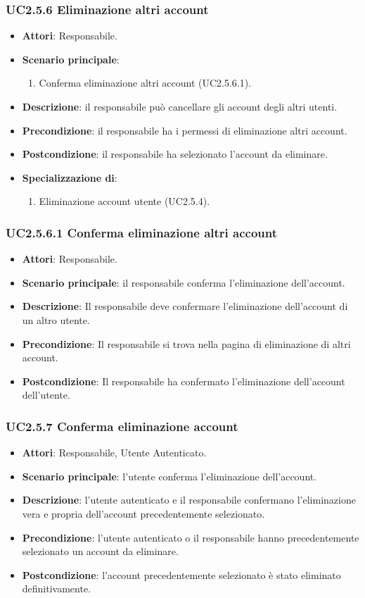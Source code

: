 \subsubsection{UC2.5.6 Eliminazione altri account}
\begin{itemize}
\item \textbf{Attori}: Responsabile.
\item \textbf{Scenario principale}:
\begin{enumerate}
\item Conferma eliminazione altri account (UC2.5.6.1).
\end{enumerate}
\item \textbf{Descrizione}: il responsabile può cancellare gli account degli altri utenti.
\item \textbf{Precondizione}: il responsabile ha i permessi di eliminazione altri account.
\item \textbf{Postcondizione}: il responsabile ha selezionato l’account da eliminare.
\item \textbf{Specializzazione di}:
\begin{enumerate}
\item Eliminazione account utente (UC2.5.4).
\end{enumerate}
\end{itemize}
\subsubsection{UC2.5.6.1 Conferma eliminazione altri account}
\begin{itemize}
\item \textbf{Attori}: Responsabile.
\item \textbf{Scenario principale}: il responsabile conferma l'eliminazione dell'account.
\item \textbf{Descrizione}: Il responsabile deve confermare l'eliminazione dell'account di un altro utente.
\item \textbf{Precondizione}: Il responsabile si trova nella pagina di eliminazione di altri account.
\item \textbf{Postcondizione}: Il responsabile ha confermato l'eliminazione dell'account dell'utente.
\end{itemize}
\subsubsection{UC2.5.7 Conferma eliminazione account}
\begin{itemize}
\item \textbf{Attori}: Responsabile, Utente Autenticato.
\item \textbf{Scenario principale}: l'utente conferma l'eliminazione dell'account.
\item \textbf{Descrizione}: l'utente autenticato e il responsabile confermano l'eliminazione vera e propria dell'account precedentemente selezionato.
\item \textbf{Precondizione}: l'utente autenticato o il responsabile hanno precedentemente selezionato un account da eliminare.
\item \textbf{Postcondizione}: l'account precedentemente selezionato è stato eliminato definitivamente.
\end{itemize}
